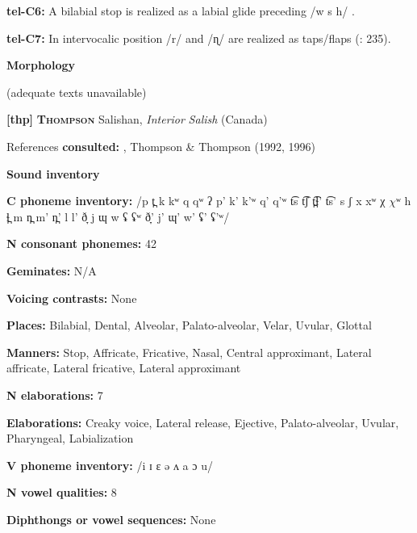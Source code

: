 \textbf{tel-C6:} A bilabial stop is realized as a labial glide preceding /w s h/ \citep[207]{Krishnamurti1998}.



\textbf{tel-C7:} In intervocalic position /r/ and /ɳ/ are realized as taps/flaps (\citealt{BhaskararaoRay2017}: 235).



\textbf{Morphology}



(adequate texts unavailable)



\textbf{[thp]}   \textbf{\textsc{Thompson}}  Salishan, \textit{Interior} \textit{Salish} (Canada)



References \textbf{consulted:} \citet{Koch2008}, Thompson \& Thompson (1992, 1996)



\textbf{Sound inventory}



\textbf{C phoneme inventory:} /p t̪ k kʷ q qʷ ʔ p’ k’ k’ʷ q’ q’ʷ t͡s t͡ʃ t̪͡ɬ’ t͡s’ s ʃ x xʷ χ $\chi ʷ$ h ɬ̪ m n̪ m’ n̪’ l l’ ð̞ j ɰ w ʢ ʢʷ ð̞’ j’ ɰ’ w’ ʢ’ ʢ’ʷ/



\textbf{N consonant phonemes:} 42



\textbf{Geminates:} N/A



\textbf{Voicing contrasts:} None



\textbf{Places:} Bilabial, Dental, Alveolar, Palato-alveolar, Velar, Uvular, Glottal 



\textbf{Manners:} Stop, Affricate, Fricative, Nasal, Central approximant, Lateral affricate, Lateral fricative, Lateral approximant



\textbf{N elaborations:} 7



\textbf{Elaborations:} Creaky voice, Lateral release, Ejective, Palato-alveolar, Uvular, Pharyngeal, Labialization



\textbf{V phoneme inventory:} /i ɪ ɛ ə ʌ a ɔ u/



\textbf{N vowel qualities:} 8



\textbf{Diphthongs or vowel sequences:} None



